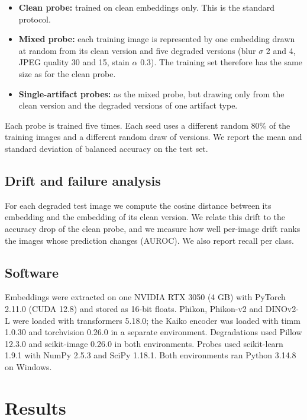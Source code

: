 \documentclass[11pt,a4paper]{article}
\begin{document}
\begin{itemize}
\item \textbf{Clean probe:} trained on clean embeddings only. This is the standard protocol.
\item \textbf{Mixed probe:} each training image is represented by one embedding drawn at random from its clean version and five degraded versions (blur $\sigma$ 2 and 4, JPEG quality 30 and 15, stain $\alpha$ 0.3). The training set therefore has the same size as for the clean probe.
\item \textbf{Single-artifact probes:} as the mixed probe, but drawing only from the clean version and the degraded versions of one artifact type.
\end{itemize}

Each probe is trained five times. Each seed uses a different random 80\% of the training images and a different random draw of versions. We report the mean and standard deviation of balanced accuracy on the test set.

\subsection{Drift and failure analysis}

For each degraded test image we compute the cosine distance between its embedding and the embedding of its clean version. We relate this drift to the accuracy drop of the clean probe, and we measure how well per-image drift ranks the images whose prediction changes (AUROC). We also report recall per class.

\subsection{Software}

Embeddings were extracted on one NVIDIA RTX 3050 (4 GB) with PyTorch 2.11.0 (CUDA 12.8) and stored as 16-bit floats. Phikon, Phikon-v2 and DINOv2-L were loaded with transformers 5.18.0; the Kaiko encoder was loaded with timm 1.0.30 and torchvision 0.26.0 in a separate environment. Degradations used Pillow 12.3.0 and scikit-image 0.26.0 in both environments. Probes used scikit-learn 1.9.1 with NumPy 2.5.3 and SciPy 1.18.1. Both environments ran Python 3.14.8 on Windows.

\section{Results}
\end{document}
